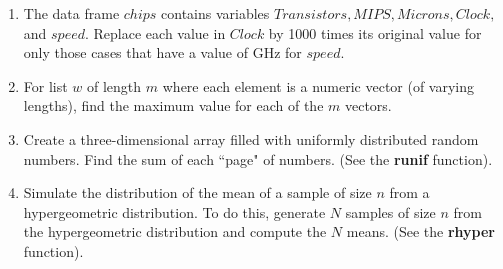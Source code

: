 \documentclass[12pt]{article}
\def\SFunctionRef#1{\textbf{#1}}
\begin{document}
\begin{enumerate}
\item The data frame $chips$ contains variables $Transistors, MIPS,
Microns, Clock,$ and $speed$. Replace each value in $Clock$ by 1000
times its original value for only those cases that have a value of GHz
for $speed$.

\item  For list $w$ of length $m$ where each element is a numeric
vector (of varying lengths), find the maximum value for each of 
the $m$ vectors.

\item Create a three-dimensional array filled with uniformly distributed
random numbers. Find the sum of each ``page" of numbers. 
(See the \SFunctionRef{runif} function).

\item Simulate the distribution of the mean of a sample of size $n$
from a hypergeometric distribution. To do this, generate $N$ samples
of size $n$ from the hypergeometric distribution and compute the
$N$ means.
(See the \SFunctionRef{rhyper} function).

\end{enumerate}
\end{document}
